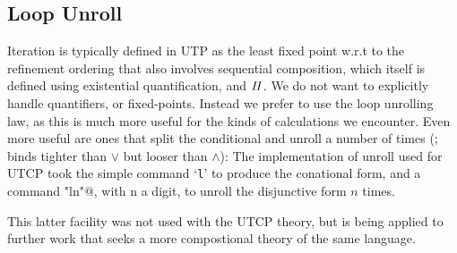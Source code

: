 \subsection{Loop Unroll}

Iteration is typically defined in UTP as the least fixed point
w.r.t to the refinement ordering
that also involves sequential composition,
which itself is defined using existential quantification,
and $\mathit{II}$.
We do not want to explicitly handle quantifiers,
or fixed-points.
Instead we prefer to use the loop unrolling law,
as this is much more useful for the kinds of calculations we encounter.
Even more useful are ones that split the conditional
and unroll a number of times ($\mathrel{;}$ binds tighter than $\lor$
but looser than $\land$):
The implementation of unroll used for UTCP
took the simple command `\texttt{l}' to produce the conational form,
and a command \verb@"ln"@, with n a digit, to unroll the disjunctive form $n$ times.

This latter facility was not used with the UTCP theory,
but is being applied to further work that seeks a more compostional
theory of the same language.
%
%
%
%
%


